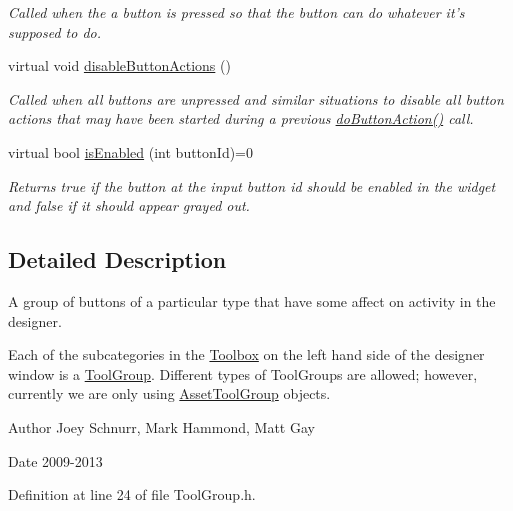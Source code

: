 \begin{DoxyCompactItemize}
\begin{DoxyCompactList}\small\item\em Called when the a button is pressed so that the button can do whatever it's supposed to do. \end{DoxyCompactList}\item 
virtual void \hyperlink{class_tool_group_ab340659ee03a519aa249bda3592255a6}{disable\-Button\-Actions} ()
\begin{DoxyCompactList}\small\item\em Called when all buttons are unpressed and similar situations to disable all button actions that may have been started during a previous \hyperlink{class_tool_group_a749e84cf4dfdf68033b44aa0b4cb7734}{do\-Button\-Action()} call. \end{DoxyCompactList}\item 
virtual bool \hyperlink{class_tool_group_adf3e25748f41ba5490aac857e375260d}{is\-Enabled} (int button\-Id)=0
\begin{DoxyCompactList}\small\item\em Returns true if the button at the input button id should be enabled in the widget and false if it should appear grayed out. \end{DoxyCompactList}\end{DoxyCompactItemize}


\subsection{Detailed Description}
A group of buttons of a particular type that have some affect on activity in the designer. 

Each of the subcategories in the \hyperlink{class_toolbox}{Toolbox} on the left hand side of the designer window is a \hyperlink{class_tool_group}{Tool\-Group}. Different types of Tool\-Groups are allowed; however, currently we are only using \hyperlink{class_asset_tool_group}{Asset\-Tool\-Group} objects. \begin{DoxyAuthor}{Author}
Joey Schnurr, Mark Hammond, Matt Gay 
\end{DoxyAuthor}
\begin{DoxyDate}{Date}
2009-\/2013 
\end{DoxyDate}


Definition at line 24 of file Tool\-Group.\-h.



